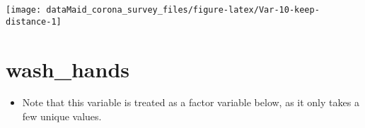 \documentclass[
]{report}
\providecommand{\tightlist}{%
  \setlength{\itemsep}{0pt}\setlength{\parskip}{0pt}}
\begin{document}
\begin{minipage}{0.25 \textwidth}

\begin{center}\texttt{[image: dataMaid\_corona\_survey\_files/figure-latex/Var-10-keep-distance-1]} \end{center}

\end{minipage}

\noindent\makebox[\linewidth]{\rule{\textwidth}{0.4pt}}

\hypertarget{wash_hands}{%
\section{wash\_hands}\label{wash_hands}}

\begin{itemize}
\tightlist
\item
  Note that this variable is treated as a factor variable below, as it
  only takes a few unique values.
\end{itemize}
\end{document}
